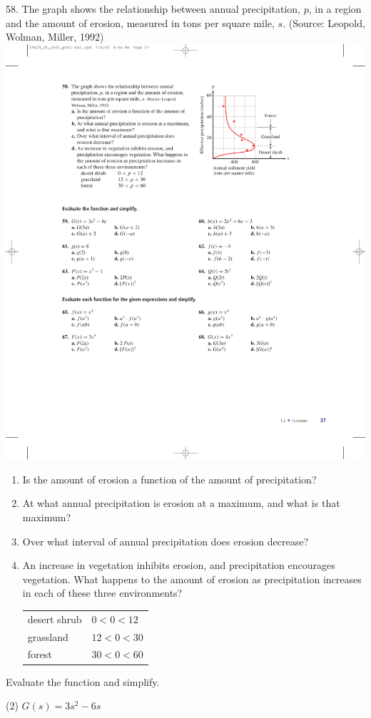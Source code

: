 \documentclass[10pt,]{book}
\theoremstyle{plain}
\theoremstyle{definition}
\theoremstyle{definition}
\theoremstyle{definition}
\theoremstyle{definition}
\numberwithin{equation}{part}
\newcommand{\lt}{<}
\begin{document}
\begin{exerciselist}
\begin{enumerate}[label=\alph*]
\end{enumerate}
%
\item[58.]\hypertarget{exercise-127}{}The graph shows the relationship between annual precipitation, \(p\), in a region and the amount of erosion, measured in tons per square mile, \(s\). (Source: Leopold, Wolman, Miller, 1992) \includegraphics[width=0.5\linewidth]{images/fig-ex-1-2-58}
 \leavevmode%
\begin{enumerate}[label=\alph*]
\item\hypertarget{li-498}{}Is the amount of erosion a function of the amount of precipitation?%
\item\hypertarget{li-499}{}At what annual precipitation is erosion at a maximum, and what is that maximum?%
\item\hypertarget{li-500}{}Over what interval of annual precipitation does erosion decrease?%
\item\hypertarget{li-501}{}An increase in vegetation inhibits erosion, and precipitation encourages vegetation. What happens to the amount of erosion as precipitation increases in each of these three environments? \begin{tabular}{ll}
desert shrub&\(0\lt 0\lt 12\)\tabularnewline[0pt]
grassland&\(12\lt 0\lt 30\)\tabularnewline[0pt]
forest&\(30\lt 0\lt 60\)
\end{tabular}
%
\end{enumerate}
%
\par\smallskip
\hypertarget{exercisegroup-13}{}\par\noindent Evaluate the function and simplify.%
\begin{exercisegroup}(2)
\exercise[59.]\hypertarget{exercise-128}{}\(G(s) = 3s^2 - 6s\) \leavevmode%
\begin{multicols}{2}
\begin{enumerate}[label=\alph*]

\end{enumerate}
\end{multicols}
\end{exercisegroup}
\end{exerciselist}
\end{document}
